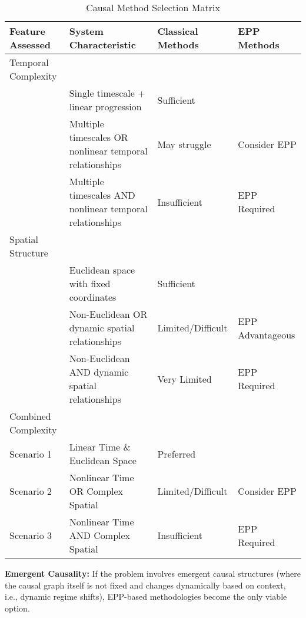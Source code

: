 \begin{table}[hb]
\begin{tabular}{llll}
Feature Assessed &
  System Characteristic &
  Classical Methods &
  EPP Methods \\ \hline
\multicolumn{1}{|l|}{Temporal Complexity} &
  \multicolumn{1}{l|}{} &
  \multicolumn{1}{l|}{} &
  \multicolumn{1}{l|}{} \\ \hline
\multicolumn{1}{|l|}{} &
  \multicolumn{1}{l|}{Single timescale + linear progression} &
  \multicolumn{1}{l|}{Sufficient} &
  \multicolumn{1}{l|}{} \\ \hline
\multicolumn{1}{|l|}{} &
  \multicolumn{1}{l|}{Multiple timescales OR nonlinear temporal relationships} &
  \multicolumn{1}{l|}{May struggle} &
  \multicolumn{1}{l|}{Consider EPP} \\ \hline
\multicolumn{1}{|l|}{} &
  \multicolumn{1}{l|}{Multiple timescales AND nonlinear temporal relationships} &
  \multicolumn{1}{l|}{Insufficient} &
  \multicolumn{1}{l|}{EPP Required} \\ \hline
\multicolumn{1}{|l|}{Spatial Structure} &
  \multicolumn{1}{l|}{} &
  \multicolumn{1}{l|}{} &
  \multicolumn{1}{l|}{} \\ \hline
\multicolumn{1}{|l|}{} &
  \multicolumn{1}{l|}{Euclidean space with fixed coordinates} &
  \multicolumn{1}{l|}{Sufficient} &
  \multicolumn{1}{l|}{} \\ \hline
\multicolumn{1}{|l|}{} &
  \multicolumn{1}{l|}{Non-Euclidean OR dynamic spatial relationships} &
  \multicolumn{1}{l|}{Limited/Difficult} &
  \multicolumn{1}{l|}{EPP Advantageous} \\ \hline
\multicolumn{1}{|l|}{} &
  \multicolumn{1}{l|}{Non-Euclidean AND dynamic spatial relationships} &
  \multicolumn{1}{l|}{Very Limited} &
  \multicolumn{1}{l|}{EPP Required} \\ \hline
\multicolumn{1}{|l|}{Combined Complexity} &
  \multicolumn{1}{l|}{} &
  \multicolumn{1}{l|}{} &
  \multicolumn{1}{l|}{} \\ \hline
\multicolumn{1}{|l|}{Scenario 1} &
  \multicolumn{1}{l|}{Linear Time \& Euclidean Space} &
  \multicolumn{1}{l|}{Preferred} &
  \multicolumn{1}{l|}{} \\ \hline
\multicolumn{1}{|l|}{Scenario 2} &
  \multicolumn{1}{l|}{Nonlinear Time OR Complex Spatial} &
  \multicolumn{1}{l|}{Limited/Difficult} &
  \multicolumn{1}{l|}{Consider EPP} \\ \hline
\multicolumn{1}{|l|}{Scenario 3} &
  \multicolumn{1}{l|}{Nonlinear Time AND Complex Spatial} &
  \multicolumn{1}{l|}{Insufficient} &
  \multicolumn{1}{l|}{EPP Required} \\ \hline
\end{tabular}
\caption{Causal Method Selection Matrix}
\label{tab:method_matrix}
\end{table}

\textbf{Emergent Causality:} If the problem involves emergent causal structures (where the causal graph itself is not fixed and changes dynamically based on context, i.e., dynamic regime shifts), EPP-based methodologies become the only viable option.


\clearpage

